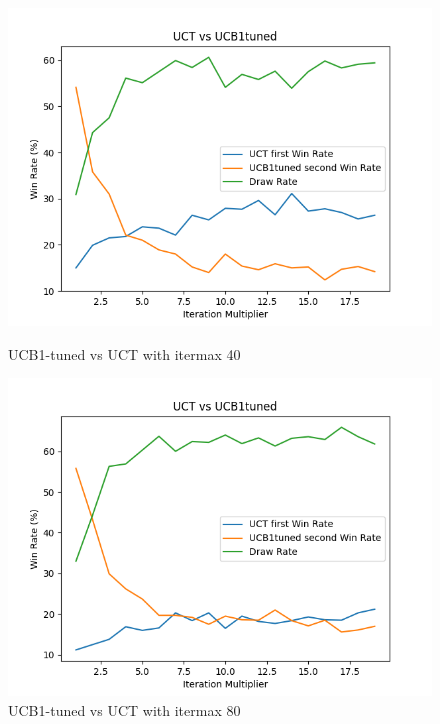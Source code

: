 \documentclass[11pt]{article}
\theoremstyle{definitionstyle}
\begin{document}
\begin{figure}[H]
    \centering
    \begin{minipage}{0.32\textwidth}
        \includegraphics[width=\textwidth]{mcts/figs/40/UCT vs UCB1tuned1.png}
        \caption{UCB1-tuned vs UCT with itermax 40}
        \label{fig:402}
    \end{minipage}
    \hfill
    \begin{minipage}{0.32\textwidth}
        \includegraphics[width=\textwidth]{mcts/figs/80/UCT vs UCB1tuned1.png}
        \caption{UCB1-tuned vs UCT with itermax 80}
        \label{fig:802}
    \end{minipage}
    \hfill
    \begin{minipage}{0.32\textwidth}

\end{minipage}
\end{figure}
\end{document}
